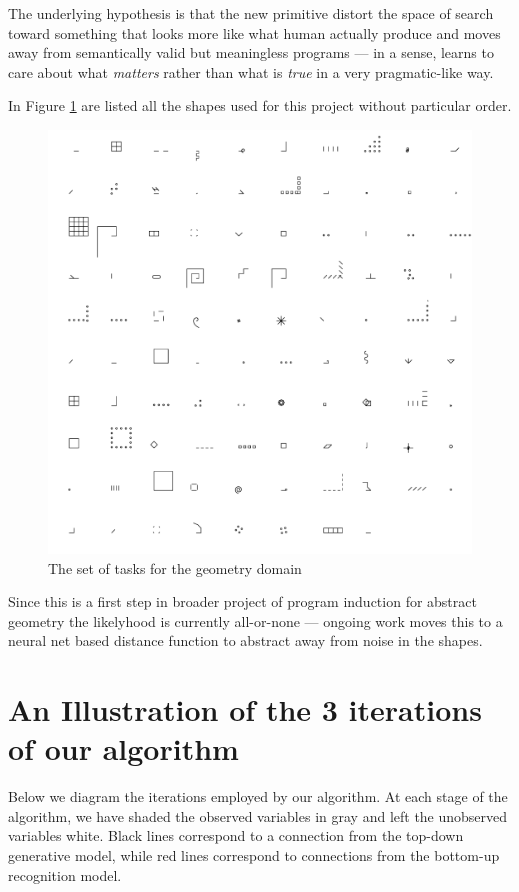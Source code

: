 \documentclass{article}
\begin{document}
The underlying hypothesis is that the new primitive distort the space of search
toward something that looks more like what human actually produce and moves away
from semantically valid but meaningless programs --- in a sense, learns to care
about what \emph{matters} rather than what is \emph{true} in a very
pragmatic-like way.

In Figure \ref{alltasksgeom} are listed all the shapes used for this project
without particular order.

\begin{figure}[h]
\centering
\includegraphics[width = \textwidth]{figures/geomAllTasks.png}
\caption{The set of tasks for the geometry domain}
\label{alltasksgeom}
\end{figure}

Since this is a first step in broader project of program induction for abstract
geometry the likelyhood is currently all-or-none --- ongoing work moves this to
a neural net based distance function to abstract away from noise in the shapes.

\newpage

\section{An Illustration of the 3 iterations of our algorithm}
Below we diagram the iterations employed by our algorithm. At each stage of the algorithm,
we have shaded the observed variables in gray and left the unobserved variables white.
Black lines correspond to a connection from the top-down
generative model, while red lines correspond to connections from the bottom-up recognition model.
\end{document}
